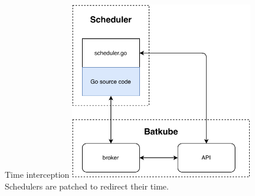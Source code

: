 \documentclass[12pt, aspectratio=43]{beamer}
\begin{document}
\begin{frame}{Time interception}
	\centering
	\includegraphics[width=0.6\textwidth]{../imgs/synchro-go-sources.pdf}\\
	\small{Schedulers are patched to redirect their time.}
\end{frame}
\end{document}
